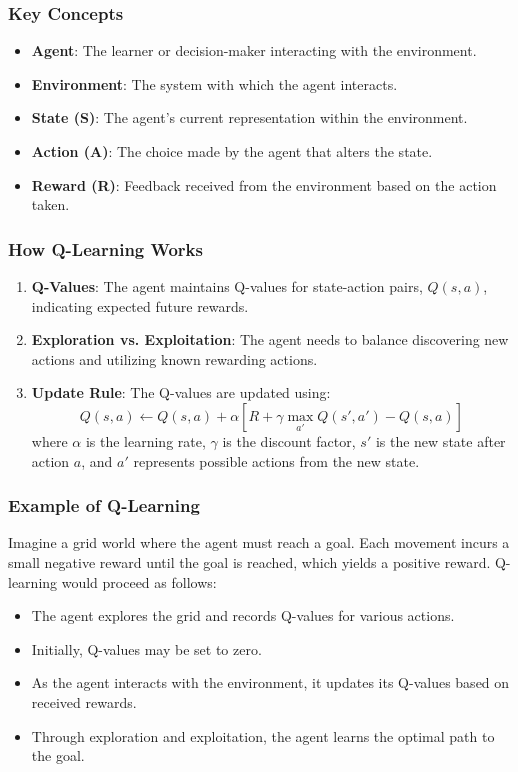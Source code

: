 \documentclass[aspectratio=169]{beamer}
\begin{document}
\begin{frame}[fragile]
    \frametitle{Key Concepts}
    
    \begin{itemize}
        \item \textbf{Agent}: The learner or decision-maker interacting with the environment.
        \item \textbf{Environment}: The system with which the agent interacts.
        \item \textbf{State (S)}: The agent's current representation within the environment.
        \item \textbf{Action (A)}: The choice made by the agent that alters the state.
        \item \textbf{Reward (R)}: Feedback received from the environment based on the action taken.
    \end{itemize}
\end{frame}

\begin{frame}[fragile]
    \frametitle{How Q-Learning Works}
    
    \begin{enumerate}
        \item \textbf{Q-Values}: The agent maintains Q-values for state-action pairs, \( Q(s, a) \), indicating expected future rewards.
        \item \textbf{Exploration vs. Exploitation}: The agent needs to balance discovering new actions and utilizing known rewarding actions.
        \item \textbf{Update Rule}: The Q-values are updated using:
        \begin{equation}
            Q(s, a) \leftarrow Q(s, a) + \alpha \left[ R + \gamma \max_{a'} Q(s', a') - Q(s, a) \right]
        \end{equation}
        where \( \alpha \) is the learning rate, \( \gamma \) is the discount factor, \( s' \) is the new state after action \( a \), and \( a' \) represents possible actions from the new state.
    \end{enumerate}
\end{frame}

\begin{frame}[fragile]
    \frametitle{Example of Q-Learning}
    
    Imagine a grid world where the agent must reach a goal. Each movement incurs a small negative reward until the goal is reached, which yields a positive reward. Q-learning would proceed as follows:
    
    \begin{itemize}
        \item The agent explores the grid and records Q-values for various actions.
        \item Initially, Q-values may be set to zero. 
        \item As the agent interacts with the environment, it updates its Q-values based on received rewards.
        \item Through exploration and exploitation, the agent learns the optimal path to the goal.
    \end{itemize}
\end{frame}
\end{document}
